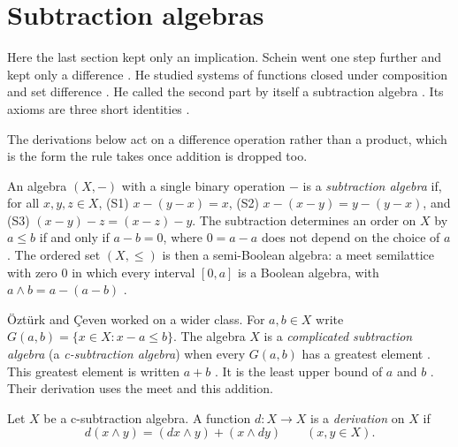 \section{Subtraction algebras}\label{sec:other-systems:subtraction-algebras}

Here the last section kept only an implication.
Schein went one step further and kept only a difference
\cite[p.~509]{OzturkCeven2009}. He studied systems of functions closed
under
composition and set difference \cite[p.~509]{OzturkCeven2009}.
He called the second part by itself a
subtraction algebra \cite[p.~509]{OzturkCeven2009}.
Its axioms are three short identities
\cite[p.~510]{OzturkCeven2009}.

The derivations below act on a difference operation rather than a product, which is the form the rule takes once addition is dropped too.

\begin{definition}\label{def:other:subtraction-algebra}
An algebra $(X, -)$ with a single binary operation $-$ is a
\emph{subtraction algebra} if, for all $x, y, z \in X$,
\textup{(S1)} $x - (y - x) = x$,
\textup{(S2)} $x - (x - y) = y - (y - x)$, and
\textup{(S3)} $(x - y) - z = (x - z) - y$.
The subtraction determines an order on $X$ by $a \le b$ if and only if
$a - b = 0$, where $0 = a - a$ does not depend on the choice of $a$. The
ordered set $(X, \le)$ is then a semi-Boolean algebra: a meet semilattice
with zero $0$ in which every interval $[0, a]$ is a Boolean algebra, with
$a \wedge b = a - (a - b)$ \cite[p.~510]{OzturkCeven2009}.
\end{definition}

{\"O}zt{\"u}rk and {\c{C}}even worked on a wider class. For $a, b \in X$
write $G(a, b) = \{x \in X : x - a \le b\}$. The algebra $X$ is a
\emph{complicated subtraction algebra} (a \emph{c-subtraction algebra})
when every $G(a, b)$ has a greatest element
\cite[Definition~2.3, p.~511]{OzturkCeven2009}. This greatest element is written
$a + b$ \cite[Definition~2.3, p.~511]{OzturkCeven2009}. It is the least
upper bound of $a$ and $b$
\cite[Definition~2.3, p.~511]{OzturkCeven2009}. Their derivation uses the
meet and this addition.

\begin{definition}\label{def:other:subtraction-derivation}
Let $X$ be a c-subtraction algebra. A function $d \colon X \to X$ is a
\emph{derivation} on $X$ if
\[
d(x \wedge y) = (dx \wedge y) + (x \wedge dy)
\qquad (x, y \in X).
\]
\end{definition}


